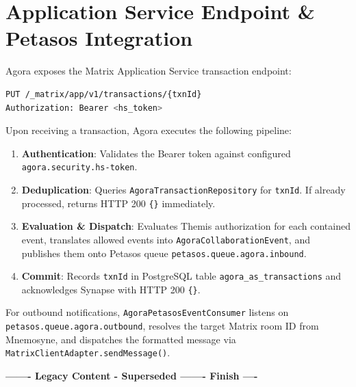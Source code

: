 \section{Application Service Endpoint \& Petasos Integration}

Agora exposes the Matrix Application Service transaction endpoint:
\begin{lstlisting}[language=bash, caption={Application Service Transaction API}]
PUT /_matrix/app/v1/transactions/{txnId}
Authorization: Bearer <hs_token>
\end{lstlisting}

Upon receiving a transaction, Agora executes the following pipeline:
\begin{enumerate}
    \item \textbf{Authentication}: Validates the Bearer token against configured \nolinkurl{agora.security.hs-token}.
    \item \textbf{Deduplication}: Queries \nolinkurl{AgoraTransactionRepository} for \nolinkurl{txnId}. If already processed, returns HTTP 200 \nolinkurl{{}} immediately.
    \item \textbf{Evaluation \& Dispatch}: Evaluates Themis authorization for each contained event, translates allowed events into \nolinkurl{AgoraCollaborationEvent}, and publishes them onto Petasos queue \nolinkurl{petasos.queue.agora.inbound}.
    \item \textbf{Commit}: Records \nolinkurl{txnId} in PostgreSQL table \nolinkurl{agora_as_transactions} and acknowledges Synapse with HTTP 200 \nolinkurl{{}}.
\end{enumerate}

For outbound notifications, \nolinkurl{AgoraPetasosEventConsumer} listens on \nolinkurl{petasos.queue.agora.outbound}, resolves the target Matrix room ID from Mnemosyne, and dispatches the formatted message via \nolinkurl{MatrixClientAdapter.sendMessage()}.


\par\noindent\textbf{------- Legacy Content - Superseded ------- Finish ----}

\newpage
